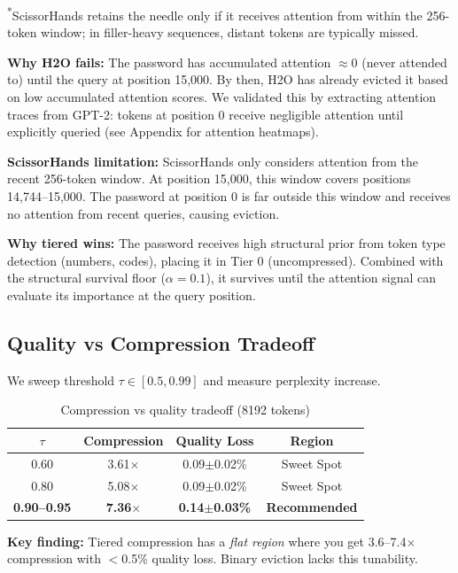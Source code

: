 \documentclass[11pt]{article}
\begin{document}
\textsuperscript{*}ScissorHands retains the needle only if it receives attention from within the 256-token window; in filler-heavy sequences, distant tokens are typically missed.

\textbf{Why H2O fails:} The password has accumulated attention $\approx 0$ (never attended to) until the query at position 15,000. By then, H2O has already evicted it based on low accumulated attention scores. We validated this by extracting attention traces from GPT-2: tokens at position 0 receive negligible attention until explicitly queried (see Appendix for attention heatmaps).

\textbf{ScissorHands limitation:} ScissorHands only considers attention from the recent 256-token window. At position 15,000, this window covers positions 14,744--15,000. The password at position 0 is far outside this window and receives no attention from recent queries, causing eviction.

\textbf{Why tiered wins:} The password receives high structural prior from token type detection (numbers, codes), placing it in Tier 0 (uncompressed). Combined with the structural survival floor ($\alpha=0.1$), it survives until the attention signal can evaluate its importance at the query position.

\subsection{Quality vs Compression Tradeoff}

We sweep threshold $\tau \in [0.5, 0.99]$ and measure perplexity increase.

\begin{table}[h]
\centering
\caption{Compression vs quality tradeoff (8192 tokens)}
\label{tab:tradeoff}
\begin{tabular}{cccc}
\toprule
\textbf{$\tau$} & \textbf{Compression} & \textbf{Quality Loss} & \textbf{Region} \\
\midrule
0.60 & 3.61$\times$ & 0.09$\pm$0.02\% & Sweet Spot \\
0.80 & 5.08$\times$ & 0.09$\pm$0.02\% & Sweet Spot \\
\textbf{0.90--0.95} & \textbf{7.36$\times$} & \textbf{0.14$\pm$0.03\%} & \textbf{Recommended} \\
\bottomrule
\end{tabular}
\end{table}

\textbf{Key finding:} Tiered compression has a \textit{flat region} where you get 3.6--7.4$\times$ compression with $<$0.5\% quality loss. Binary eviction lacks this tunability.
\end{document}
